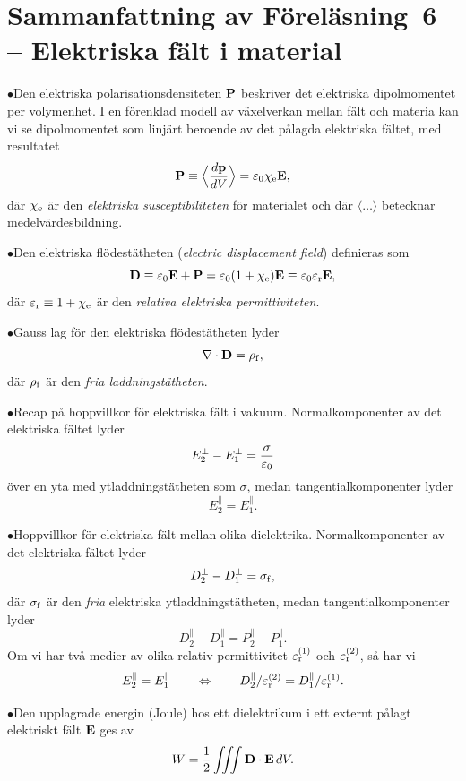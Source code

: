 {{{{{\section{Sammanfattning av F{\"o}rel{\"a}sning~6
  -- Elektriska f\"alt i material}
\item{$\bullet$}{Den elektriska polarisationsdensiteten ${\bf P}$ beskriver
  det elektriska dipolmomentet per volymenhet. I en f{\"o}renklad modell av
  v{\"a}xelverkan mellan f{\"a}lt och materia kan vi se dipolmomentet som
  linj{\"a}rt beroende av det p{\aa}lagda elektriska f{\"a}ltet, med resultatet
  $$
    {\bf P} \equiv \Big\langle{{d{\bf p}}\over{dV}}\Big\rangle
      = \varepsilon_0\chi_{\rm e}{\bf E},
  $$
  d{\"a}r $\chi_{\rm e}$ {\"a}r den {\it elektriska susceptibiliteten}
  f{\"o}r materialet och d{\"a}r $\langle\ldots\rangle$ betecknar
  medelv{\"a}rdes\-bildning.}
\item{$\bullet$}{Den elektriska fl{\"o}dest{\"a}theten ({\it electric
  displacement field}) definieras som
  $$
      {\bf D}
        \equiv\varepsilon_0{\bf E}+{\bf P}
        =\varepsilon_0(1+\chi_{\rm e}){\bf E}
        \equiv\varepsilon_0\varepsilon_{\rm r}{\bf E},
  $$
  d{\"a}r $\varepsilon_{\rm r}\equiv 1+\chi_{\rm e}$ {\"a}r den {\it relativa
  elektriska permittiviteten}.}
\item{$\bullet$}{Gauss lag f{\"o}r den elektriska fl{\"o}dest{\"a}theten lyder
  $$
    \nabla\cdot{\bf D}=\rho_{\rm f},
  $$
  d{\"a}r $\rho_{\rm f}$ {\"a}r den {\it fria laddningst{\"a}theten}.}
\item{$\bullet$}{Recap p{\aa} hoppvillkor f{\"o}r elektriska f{\"a}lt i vakuum.
  Normalkomponenter av det elektriska f{\"a}ltet lyder
  $$
    E^{\perp}_2-E^{\perp}_1={{\sigma}\over{\varepsilon_0}}
  $$
  {\"o}ver en yta med ytladdningst{\"a}theten som $\sigma$, medan
  tangentialkomponenter lyder
  $$
    E^{\parallel}_2=E^{\parallel}_1.
  $$}
\item{$\bullet$}{Hoppvillkor f{\"o}r elektriska f{\"a}lt mellan olika
  dielektrika. Normalkomponenter av det elektriska f{\"a}ltet lyder
  $$
    D^{\perp}_{2}-D^{\perp}_{1} = \sigma_{\rm f},
  $$
  d{\"a}r $\sigma_{\rm f}$ {\"a}r den {\it fria} elektriska
  ytladdningst{\"a}theten, medan tangentialkomponenter lyder
  $$
    D^{\parallel}_2-D^{\parallel}_1 = P^{\parallel}_2-P^{\parallel}_1.
  $$
  Om vi har tv{\aa} medier av olika relativ permittivitet
  $\varepsilon^{(1)}_{\rm r}$ och $\varepsilon^{(2)}_{\rm r}$, s{\aa} har vi
  $$
    E^{\parallel}_2=E^{\parallel}_1
    \qquad\Leftrightarrow\qquad
    {{D^{\parallel}_2}/{\varepsilon^{(2)}_{\rm r}}}
      ={{D^{\parallel}_1}/{\varepsilon^{(1)}_{\rm r}}}.
  $$}
\item{$\bullet$}{Den upplagrade energin (Joule) hos ett dielektrikum i ett
  externt p{\aa}lagt elektriskt f{\"a}lt ${\bf E}$ ges av
  $$
    W = {{1}\over{2}}\iiint{\bf D}\cdot{\bf E}\,dV.
  $$}

}}}}}
